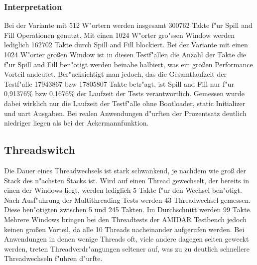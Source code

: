 \subsubsection{Interpretation}
Bei der Variante mit 512 W"ortern werden insgesamt 300762 Takte f"ur Spill and Fill Operationen genutzt. Mit einen 1024 W"orter gro"{ss}en Window werden lediglich 162702 Takte durch Spill and Fill blockiert. Bei der Variante mit einen 1024 W"orter großen Window ist in diesen Testf"allen die Anzahl der Takte die f"ur Spill and Fill ben"otigt werden beinahe halbiert, was ein großen Performance Vorteil andeutet. Ber"ucksichtigt man jedoch, das die Gesamtlaufzeit der Testf"alle 17943867 bzw 17805807 Takte betr"agt, ist Spill and Fill nur f"ur 0,91376\% bzw 0,1676\% der Laufzeit der Tests verantwortlich. Gemessen wurde dabei wirklich nur die Laufzeit der Testf"alle ohne Bootloader, static Initializer und uart Ausgaben. Bei realen Anwendungen d"urften der Prozentsatz deutlich niedriger liegen als bei der Ackermannfunktion. 


\subsection{Threadswitch}
Die Dauer eines Threadwechsels ist stark schwankend, je nachdem wie groß der Stack des n"achsten Stacks ist. Wird auf einen Thread gewechselt, der bereits in einen der Windows liegt, werden lediglich 5 Takte f"ur den Wechsel ben"otigt. Nach Ausf"uhrung der Multithreading Tests werden 43 Threadwechsel gemessen. Diese ben"otigten zwischen 5 und 245 Takten. Im Durchschnitt werden 99 Takte. Mehrere Windows bringen bei den Threadtests der AMIDAR Testbench jedoch keinen großen Vorteil, da alle 10 Threads nacheinander aufgerufen werden. Bei Anwendungen in denen wenige Threads oft, viele andere dagegen selten geweckt werden, treten Threadverdr"angungen seltener auf, was zu zu deutlich schnellere Threadwechseln f"uhren d"urfte. 

